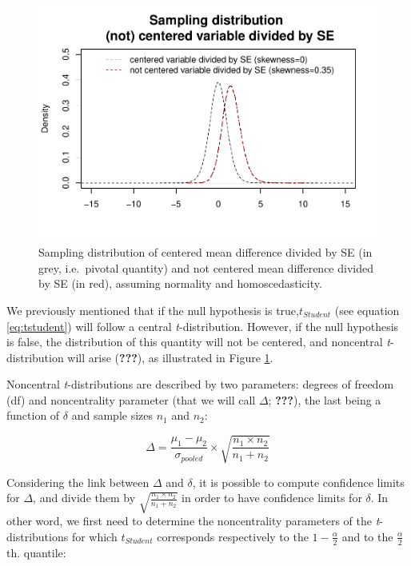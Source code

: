\documentclass[
  man,floatsintext]{apa6}
\begin{document}
\begin{figure}
\centering
\includegraphics{Appendix2_files/figure-latex/SAMPLMEANDIFF3-1.pdf}
\caption{\label{fig:SAMPLMEANDIFF3}Sampling distribution of centered mean difference divided by SE (in grey, i.e.~pivotal quantity) and not centered mean difference divided by SE (in red), assuming normality and homoscedasticity.}
\end{figure}

We previously mentioned that if the null hypothesis is true,\(t_{Student}\) (see equation \eqref{eq:tstudent}) will follow a central \emph{t}-distribution. However, if the null hypothesis is false, the distribution of this quantity will not be centered, and noncentral \emph{t}-distribution will arise ({\textbf{???}}), as illustrated in Figure \ref{fig:SAMPLMEANDIFF3}.

Noncentral \emph{t}-distributions are described by two parameters: degrees of freedom (df) and noncentrality parameter (that we will call \(\Delta\); {\textbf{???}}), the last being a function of \(\delta\) and sample sizes \(n_1\) and \(n_2\):

\begin{equation}
\Delta = \frac{\mu_1-\mu_2}{\sigma_{pooled}} \times \sqrt{\frac{n_1 \times n_2}{n_1 + n_2}}
\label{eq:ncp}
\end{equation}

Considering the link between \(\Delta\) and \(\delta\), it is possible to compute confidence limits for \(\Delta\), and divide them by \(\sqrt{\frac{n_1 \times n_2}{n_1 + n_2}}\) in order to have confidence limits for \(\delta\). In other word, we first need to determine the noncentrality parameters of the \emph{t}-distributions for which \(t_{Student}\) corresponds respectively to the \(1-\frac{\alpha}{2}\) and to the \(\frac{\alpha}{2}\) th. quantile:
\end{document}
